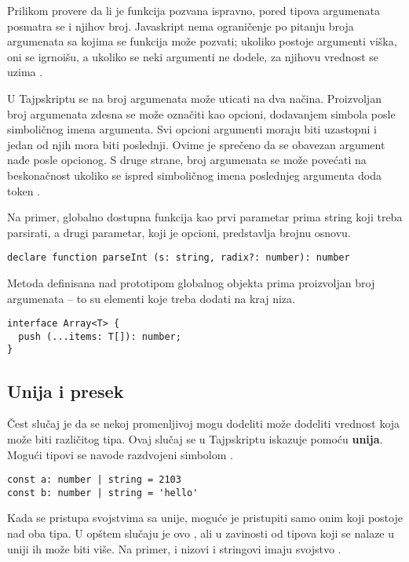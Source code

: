 Prilikom provere da li je funkcija pozvana ispravno, pored tipova argumenata posmatra se i njihov broj.
Javaskript nema ograničenje po pitanju broja argumenata sa kojima se funkcija može pozvati; ukoliko postoje argumenti viška, oni se igrnoišu, a ukoliko se neki argumenti ne dodele, za njihovu vrednost se uzima .

U Tajpskriptu se na broj argumenata može uticati na dva načina.
Proizvoljan broj argumenata zdesna se može označiti kao opcioni, dodavanjem simbola  posle simboličnog imena argumenta.
Svi opcioni argumenti moraju biti uzastopni i jedan od njih mora biti poslednji.
Ovime je sprečeno da se obavezan argument nađe posle opcionog.
S druge strane, broj argumenata se može povećati na beskonačnost ukoliko se ispred simboličnog imena poslednjeg argumenta doda token .

Na primer, globalno dostupna funkcija  kao prvi parametar prima string koji treba parsirati, a drugi parametar, koji je opcioni, predstavlja brojnu osnovu.

\begin{verbatim}
declare function parseInt (s: string, radix?: number): number
\end{verbatim}

Metoda  definisana nad prototipom globalnog objekta  prima proizvoljan broj argumenata -- to su elementi koje treba dodati na kraj niza.

\begin{verbatim}
interface Array<T> {
  push (...items: T[]): number;
}
\end{verbatim}

\subsection{Unija i presek}

Čest slučaj je da se nekoj promenljivoj mogu dodeliti može dodeliti vrednost koja može biti različitog tipa.
Ovaj slučaj se u Tajpskriptu iskazuje pomoću \textbf{unija}.
Mogući tipovi se navode razdvojeni simbolom \code{|}.

\begin{verbatim}
const a: number | string = 2103
const b: number | string = 'hello'
\end{verbatim}

Kada se pristupa svojstvima sa unije, moguće je pristupiti samo onim koji postoje nad oba tipa.
U opštem slučaju je ovo , ali u zavinosti od tipova koji se nalaze u uniji ih može biti više.
Na primer, i nizovi i stringovi imaju svojstvo .

